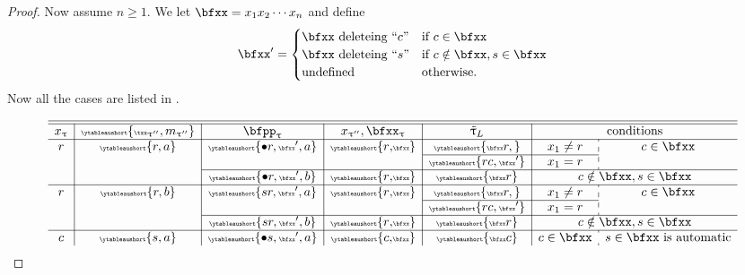 \documentclass[12pt,a4paper]{amsart}
\numberwithin{equation}{section}
\theoremstyle{remark}
\let\ytb=\ytableaushort
\newcommand{\tytb}[1]{{\tiny\ytb{#1}}}
\def\uptaupp{\uptau^{\prime\prime}}
\def\tuptau{\tilde{\uptau}}
\begin{document}
\begin{proof}
    Now assume $n\geq 1$.
    We let $\bfxx = x_{1}x_{2}\cdots x_{n}$ and define
    \[
      \bfxx' = \begin{cases}
        \bfxx \text{ deleteing ``$c$''}  & \text{if } c\in \bfxx\\
        \bfxx \text{ deleteing ``$s$''}  & \text{if } c\notin \bfxx, s\in \bfxx\\
        \text{undefined} & \text{otherwise.}
      \end{cases}
    \]
    Now all the cases are listed in .

    \begin{table}[p]
      \[
        \begin{array}{c|c|c|c|c|c:c}
          \hline
          \hline
          x_{\uptau} & \tytb{{\txx_{\uptaupp}},{m_{\uptaupp}}} & \bfpp_{\uptau} & x_{\uptaupp}, \bfxx_{\uptau}
          & \tuptau_{L} & \multicolumn{2}{ c}{\text{conditions}}\\
          \hline
          r & \tytb{r,a} &  \tytb{\bullet r,{\bfxx'},a} & \tytb{r{,}{\bfxx}} & \tytb{{\bfxx}r,}& x_{1}\neq r& c\in \bfxx  \\
          \cline{5-6}
                     & & & &\tytb{rc,{\bfxx'}} & x_{1}=r& \\
          \cline{3-3}\cline{4-7}
                     &            &  \tytb{\bullet r,{\bfxx'},b} & \tytb{r{,}{\bfxx}} & \tytb{{\bfxx}r}
                        & \multicolumn{2}{c}{c\notin \bfxx,s\in \bfxx} \\
          \hline
          r & \tytb{r,b} &  \tytb{sr,{\bfxx'},a} & \tytb{r{,}{\bfxx}} & \tytb{{\bfxx}r,}& x_{1}\neq r& c\in \bfxx  \\
          \cline{5-6}
                     & & & &\tytb{rc,{\bfxx'}} & x_{1}=r& \\
          \cline{3-3}\cline{4-7}
                     &            &  \tytb{sr,{\bfxx'},b} & \tytb{r{,}{\bfxx}} & \tytb{{\bfxx}r}
                        & \multicolumn{2}{c}{c\notin \bfxx,s\in \bfxx} \\
          \hline
          c & \tytb{s,a} &\tytb{\bullet s,{\bfxx'},a} & \tytb{c{,}{\bfxx}} & \tytb{{\bfxx}c}
                        & c\in \bfxx   & s\in \bfxx \text{ is automatic} \\%

\end{array}\]
\end{table}
\end{proof}
\end{document}
